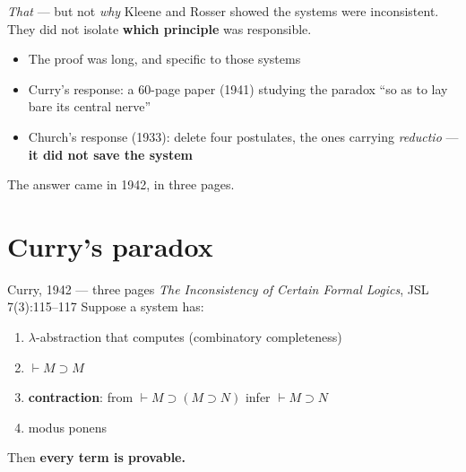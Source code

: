 \documentclass[aspectratio=169,11pt]{beamer}
\newcommand{\key}[1]{{\color{accent}\textbf{#1}}}
\newcommand{\bad}[1]{{\color{warn}\textbf{#1}}}
\begin{document}
\begin{frame}{\emph{That} --- but not \emph{why}}
  \vfill
  Kleene and Rosser showed the systems were inconsistent.\\
  They did not isolate \key{which principle} was responsible.
  \vfill
  \begin{itemize}\itemsep0.6em
    \item The proof was long, and specific to those systems
    \item Curry's response: a 60-page paper (1941) studying the paradox
          ``so as to lay bare its central nerve''
    \item Church's response (1933): delete four postulates, the ones carrying
          \emph{reductio} --- \bad{it did not save the system}
  \end{itemize}
  \vfill
  \pause
  \begin{center}\Large The answer came in 1942, in three pages.\end{center}
  \vfill
\end{frame}

\section{Curry's paradox}

\begin{frame}{Curry, 1942 --- three pages}
  \textit{The Inconsistency of Certain Formal Logics}, JSL 7(3):115--117
  \vfill
  Suppose a system has:
  \begin{enumerate}\itemsep0.5em
    \item $\lambda$-abstraction that computes \hfill {\small(combinatory completeness)}
    \item $\vdash M \supset M$
    \item \key{contraction}: \; from $\vdash M \supset (M \supset N)$ \; infer \; $\vdash M \supset N$
    \item modus ponens
  \end{enumerate}
  \vfill
  \pause
  \begin{center}\Large Then \bad{every term is provable.}\end{center}
\end{frame}
\end{document}
